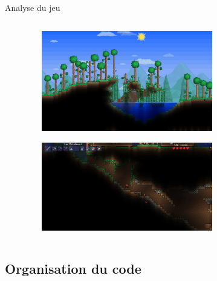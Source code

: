 \documentclass[aspectratio=169]{beamer}
\begin{document}
\begin{frame}{Analyse du jeu}
    \begin{columns}
        \centering
        \begin{column}{0.5\textwidth}
            \centering
            \lipsum[1][1-5]
        \end{column}
        \begin{column}{0.5\textwidth}
            \centering
            \begin{figure}
                \centering
                \includegraphics[width=0.7\textwidth]{assets/terraria_forest_biome.jpg}
            \end{figure}
            \begin{figure}
                \centering
                \includegraphics[width=0.7\textwidth]{assets/terraria_cavern.png}
            \end{figure}
        \end{column}
    \end{columns}
\end{frame}

\subsection{Organisation du code}
\end{document}
